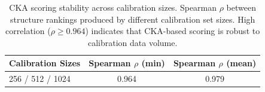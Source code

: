 \begin{table}[h]
\centering
\small
\caption{CKA scoring stability across calibration sizes. Spearman $\rho$ between structure rankings produced by different calibration set sizes. High correlation ($\rho \geq 0.964$) indicates that CKA-based scoring is robust to calibration data volume.}
\label{tab:cka_stability}
\begin{tabular}{@{}lcc@{}}
\toprule
Calibration Sizes & Spearman $\rho$ (min) & Spearman $\rho$ (mean) \\
\midrule
256 / 512 / 1024 & 0.964 & 0.979 \\
\bottomrule
\end{tabular}
\end{table}
